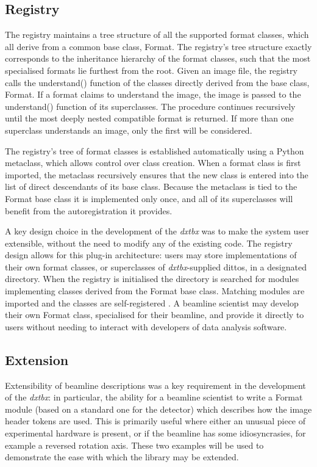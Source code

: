 \documentclass[preprint]{iucr}
\newcommand{\dxtbx}{\emph{dxtbx}\xspace}
\begin{document}
\subsection{Registry}

The registry maintains a tree structure of all the supported format classes, 
which all derive from a common base class, Format. The registry's tree structure 
exactly corresponds to the inheritance hierarchy of the format classes, such 
that the most specialised formats lie furthest from the root. Given an image 
file, the registry calls the understand() function of the classes directly 
derived from the base class, Format. If a format claims to understand the image, 
the image is passed to the understand() function of its superclasses. The 
procedure continues recursively until the most deeply nested compatible format 
is returned. If more than one superclass understands an image, only the first 
will be considered.

The registry's tree of format classes is established automatically using a 
Python metaclass, which allows control over class creation. When a format class 
is first imported, the metaclass recursively ensures that the new class is 
entered into the list of direct descendants of its base class. Because the 
metaclass is tied to the Format base class it is implemented only once, and all 
of its superclasses will benefit from the autoregistration it provides.

A key design choice in the development of the \dxtbx was to make the system user 
extensible, without the need to modify any of the existing code. The registry 
design allows for this plug-in architecture: users may store implementations of 
their own format classes, or superclasses of \dxtbx-supplied dittos, in a 
designated directory. When the registry is initialised the directory is searched 
for modules implementing classes derived from the Format base class. Matching 
modules are imported and the classes are self-registered . A beamline scientist 
may develop their own Format class, specialised for their beamline, and provide 
it directly to users without needing to interact with developers of data 
analysis software.

\subsection{Extension}

Extensibility of beamline descriptions was a key requirement in the development 
of the \dxtbx: in particular, the ability for a beamline scientist to write a 
Format module (based on a standard one for the detector) which describes how the 
image header tokens are used. This is primarily useful where either an unusual 
piece of experimental hardware is present, or if the beamline has some 
idiosyncrasies, for example a reversed rotation axis. These two examples will be 
used to demonstrate the ease with which the library may be extended.
\end{document}
